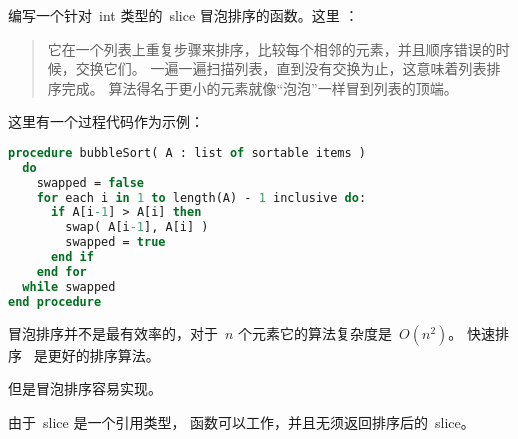 \begin{Exercise}[title={冒泡排序},difficulty=1]
\label{ex:bubble}
\Question\label{ex:bubble q1} 编写一个针对~int 类型的~slice 冒泡排序的函数。这里 \cite{bubblesort}：
\begin{quote}
它在一个列表上重复步骤来排序，比较每个相邻的元素，并且顺序错误的时候，交换它们。
一遍一遍扫描列表，直到没有交换为止，这意味着列表排序完成。
算法得名于更小的元素就像``泡泡''一样冒到列表的顶端。
\end{quote}

\cite{bubblesort} 这里有一个过程代码作为示例：
\begin{lstlisting}[language=pascal]
procedure bubbleSort( A : list of sortable items )
  do
    swapped = false
    for each i in 1 to length(A) - 1 inclusive do:
      if A[i-1] > A[i] then
        swap( A[i-1], A[i] )
        swapped = true
      end if
    end for
  while swapped
end procedure
\end{lstlisting}
\end{Exercise}

\begin{Answer}
\Question 
冒泡排序并不是最有效率的，对于~$n$ 个元素它的算法复杂度是~$O(n^2)$。
快速排序~\cite{quicksort} 是更好的排序算法。

但是冒泡排序容易实现。


由于~slice 是一个引用类型， 函数可以工作，并且无须返回排序后的~slice。
\end{Answer}
